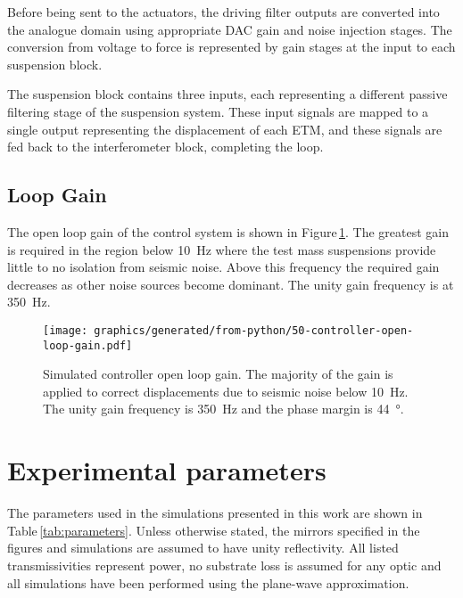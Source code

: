 Before being sent to the actuators, the driving filter outputs are converted into the analogue domain using appropriate \gls{DAC} gain and noise injection stages. The conversion from voltage to force is represented by gain stages at the input to each suspension block.

The suspension block contains three inputs, each representing a different passive filtering stage of the suspension system. These input signals are mapped to a single output representing the displacement of each \gls{ETM}, and these signals are fed back to the interferometer block, completing the loop.

\subsection{Loop Gain}

The open loop gain of the control system is shown in Figure\,\ref{fig:open-loop-gain}. The greatest gain is required in the region below \SI{10}{\hertz} where the test mass suspensions provide little to no isolation from seismic noise. Above this frequency the required gain decreases as other noise sources become dominant. The unity gain frequency is at \SI{350}{\hertz}.

\begin{figure}
  \texttt{[image: graphics/generated/from-python/50-controller-open-loop-gain.pdf]}
  \caption{\label{fig:open-loop-gain}Simulated \SSM{} controller open loop gain. The majority of the gain is applied to correct displacements due to seismic noise below \SI{10}{\hertz}. The unity gain frequency is \SI{350}{\hertz} and the phase margin is \SI{44}{\degree}.}
\end{figure}

\section{\label{app:parameters}Experimental parameters}
The parameters used in the simulations presented in this work are shown in Table\,\ref{tab:parameters}. Unless otherwise stated, the mirrors specified in the figures and simulations are assumed to have unity reflectivity. All listed transmissivities represent power, no substrate loss is assumed for any optic and all simulations have been performed using the plane-wave approximation.

